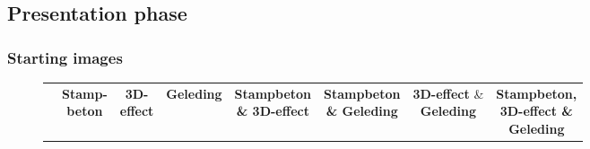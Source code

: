 \subsection{Presentation phase}
\subsubsection{Starting images}
\begin{figure}[H]
  \centering
  {\footnotesize
  \renewcommand{\arraystretch}{1.1}
  \setlength{\tabcolsep}{4pt}
  \begin{tabular}{c c c c c c c c}
    & \shortstack{\textbf{Stamp-}\\\textbf{beton}} 
    & \shortstack{\textbf{3D-}\\\textbf{effect}} 
    & \textbf{Geleding} 
    & \shortstack{\textbf{Stampbeton}\\ \textbf{\& 3D-effect}} 
    & \shortstack{\textbf{Stampbeton}\\ \textbf{\& Geleding}} 
    & \shortstack{\textbf{3D-effect} \&\\ \textbf{Geleding}} 
    & \shortstack{\textbf{Stampbeton,}\\\textbf{3D-effect \&}\\\textbf{Geleding}} \\


\end{tabular}}
\end{figure}
